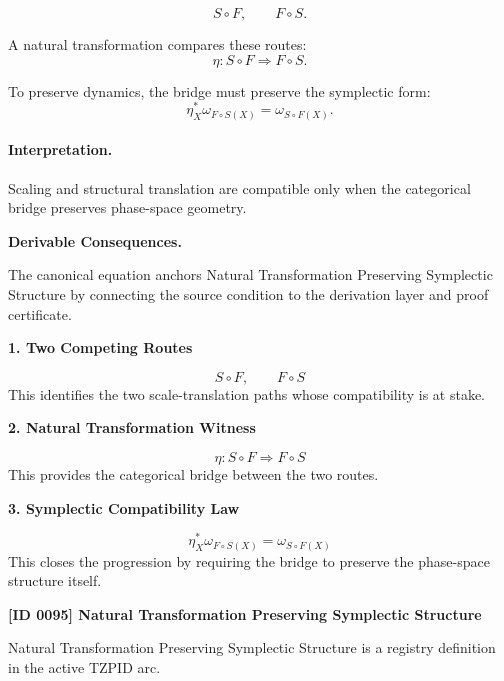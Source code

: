 \begin{equation}
S\circ F,
\qquad
F\circ S.
\end{equation}

A natural transformation compares these routes:
\begin{equation}
\eta:S\circ F\Rightarrow F\circ S.
\end{equation}

To preserve dynamics, the bridge must preserve the symplectic form:
\begin{equation}
\boxed{
\eta_X^{*}\omega_{F\circ S(X)}
=
\omega_{S\circ F(X)}.
}
\end{equation}

\paragraph{Interpretation.}
Scaling and structural translation are compatible only when the categorical bridge preserves phase-space geometry.

\par\vspace{0.35em}
\noindent\textbf{Derivable Consequences.}\quad
\begingroup
\footnotesize
\raggedright
The canonical equation anchors Natural Transformation Preserving Symplectic Structure by connecting the source condition to the derivation layer and proof certificate.
\par\endgroup

\noindent\textbf{1. Two Competing Routes}\par
\[
S \circ F,
\qquad
F \circ S
\]
\noindent This identifies the two scale-translation paths whose compatibility is at stake.\par
\noindent\textbf{2. Natural Transformation Witness}\par
\[
\eta : S \circ F \Rightarrow F \circ S
\]
\noindent This provides the categorical bridge between the two routes.\par
\noindent\textbf{3. Symplectic Compatibility Law}\par
\[
\eta_X^{\ast}\omega_{F\circ S(X)} = \omega_{S\circ F(X)}
\]
\noindent This closes the progression by requiring the bridge to preserve the phase-space structure itself.\par

\clearpage
\noindent\textbf{[ID 0095] Natural Transformation Preserving Symplectic Structure}\par
\vspace{0.35em}
\begingroup\small
{}
Natural Transformation Preserving Symplectic Structure is a registry definition in the active TZPID arc.

